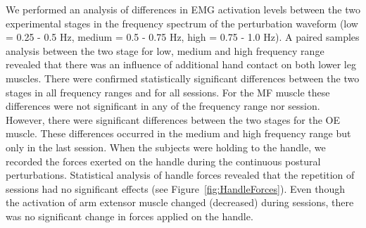 \documentclass[final,5p,twocolumn]{elsarticle}
\begin{document}
We performed an analysis of differences in EMG activation levels between the two experimental stages in the frequency spectrum of the perturbation waveform (low = 0.25 - 0.5 Hz, medium = 0.5 - 0.75 Hz, high = 0.75 - 1.0 Hz). A paired samples analysis between the two stage for low, medium and high frequency range revealed that there was an influence of additional hand contact on both lower leg muscles. There were confirmed statistically significant differences between the two stages in all frequency ranges and for all sessions. For the MF muscle these differences were not significant in any of the frequency range nor session. However, there were significant differences between the two stages for the OE muscle. These differences occurred in the medium and high frequency range but only in the last session. When the subjects were holding to the handle, we recorded the forces exerted on the handle during the continuous postural perturbations. Statistical analysis of handle forces revealed that the repetition of sessions had no significant effects (see Figure~\ref{fig:HandleForces}). Even though the activation of arm extensor muscle changed (decreased) during sessions, there was no significant change in forces applied on the handle.\\
\end{document}
